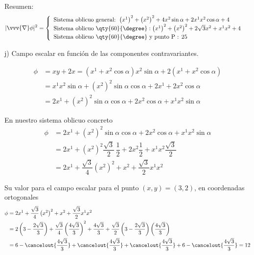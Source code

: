 \noindent
Resumen:
\[
  |\vvv{\nabla}\phi|^2 =
  \begin{cases}
    \begin{array}{l}
      \text{Sistema oblicuo general: }
      \left(x^1\right)^2 + \left(x^2\right)^2 + 4x^2\sin\alpha + 2x^1x^2\cos\alpha + 4\\
      \text{Sistema oblicuo \qty{60}{\degree}}:
      \left(x^1\right)^2 + \left(x^2\right)^2 + 2\sqrt{3} x^2 + x^1 x^2 + 4\\
      \text{Sistema oblicuo \qty{60}{\degree} y punto } $P$ \text{ : }
      25
    \end{array}
  \end{cases}
\]

\noindent
j) Campo escalar en función de las componentes contravariantes.

\begin{align*}
  \phi
  &=
    xy+2x
    = \left(x^1+x^2\cos\alpha\right) x^2\sin\alpha + 2 \left(x^1+x^2\cos\alpha\right)\\
  &=
    x^1x^2\sin\alpha
    + \left(x^2\right)^2\sin\alpha\cos\alpha
    + 2 x^1
    + 2x^2\cos\alpha\\
  &=
    2 x^1
    + \left(x^2\right)^2\sin\alpha\cos\alpha
    + 2x^2\cos\alpha
    + x^1x^2\sin\alpha
\end{align*}

En nuestro sistema oblicuo concreto
\begin{align*}
  \phi
  &=
    2 x^1
    + \left(x^2\right)^2\sin\alpha\cos\alpha
    + 2x^2\cos\alpha
    + x^1x^2\sin\alpha\\
  &=
    2x^1
    + \left(x^2\right)^2\dfrac{\sqrt{3}}{2}\,\dfrac{1}{2}
    + 2x^2\dfrac{1}{2}
    + x^1x^2\dfrac{\sqrt{3}}{2}\\
  &=
    2x^1
    + \dfrac{\sqrt{3}}{4}\left(x^2\right)^2
    + x^2
    + \dfrac{\sqrt{3}}{2}x^1x^2
\end{align*}

Su valor para el campo escalar para el punto $(x,y) = (3, 2)$, en coordenadas
ortogonales
\begin{align*}
  \phi
  &=
    2x^1
    + \dfrac{\sqrt{3}}{4}\left(x^2\right)^2
    + x^2
    + \dfrac{\sqrt{3}}{2}x^1x^2\\
  &=
    2\left(3-\dfrac{2\sqrt{3}}{3}\right)
    + \dfrac{\sqrt{3}}{4}\left(\dfrac{4\sqrt{3}}{3}\right)^2
    + \dfrac{4\sqrt{3}}{3}
    + \dfrac{\sqrt{3}}{2} \left(3-\dfrac{2\sqrt{3}}{3}\right)
    \left(\dfrac{4\sqrt{3}}{3}\right)\\
  &=
    6
    - \cancelout{\dfrac{4\sqrt{3}}{3}}
    + \cancelout{\dfrac{4\sqrt{3}}{3}}
    + \cancelout{\dfrac{4\sqrt{3}}{3}}
    + 6
    - \cancelout{\dfrac{4\sqrt{3}}{3}}
    = 12
\end{align*}

